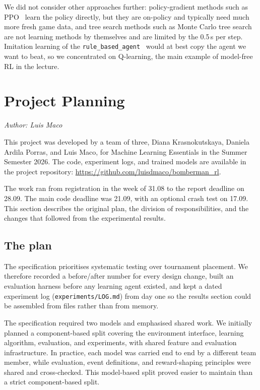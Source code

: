 \documentclass[11pt]{article}
\newcommand{\authorline}[1]{\noindent\textit{Author: #1}\par\medskip}
\newcommand{\code}[1]{\texttt{#1}}
\begin{document}
We did not consider other approaches further: policy-gradient methods such as
PPO~\cite{schulman2017} learn the policy directly, but they are on-policy and typically
need much more fresh game data, and tree search methods such as Monte Carlo tree
search~\cite{browne2012} are not learning methods by themselves and are limited by the
0.5\,s per step. Imitation learning of the \code{rule\_based\_agent}~\cite{ross2011}
would at best copy the agent we want to beat, so we concentrated on Q-learning, the main
example of model-free RL in the lecture.


\section{Project Planning}
\authorline{Luis Maco}

This project was developed by a team of three, Diana Krasnokutskaya, Daniela Ardila
Porras, and Luis Maco, for Machine Learning Essentials in the Summer Semester 2026. The
code, experiment logs, and trained models are available in the project repository:
\url{https://github.com/luisdmaco/bomberman_rl}.

The work ran from registration in the week of 31.08 to the report deadline on 28.09. The
main code deadline was 21.09, with an optional crash test on 17.09. This section describes
the original plan, the division of responsibilities, and the changes that followed from
the experimental results.

\subsection{The plan}

The specification prioritises systematic testing over tournament placement. We therefore
recorded a before/after number for every design change, built an evaluation harness before
any learning agent existed, and kept a dated experiment log
(\code{experiments/LOG.md}) from day one so the results section could be assembled from
files rather than from memory.

The specification required two models and emphasised shared work. We initially planned a
component-based split covering the environment interface, learning algorithm, evaluation,
and experiments, with shared feature and evaluation infrastructure. In practice, each model
was carried end to end by a different team member, while evaluation, event definitions, and
reward-shaping principles were shared and cross-checked. This model-based split proved
easier to maintain than a strict component-based split.
\end{document}
